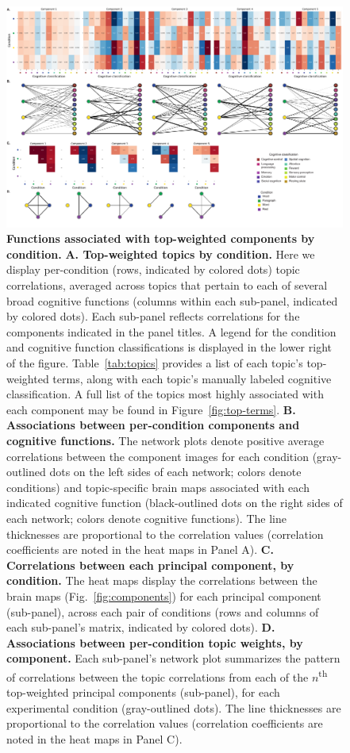 \documentclass[english]{article}
\begin{document}
\begin{figure}[tp]
  \centering
  \includegraphics[width=\textwidth]{figs/components_neurosynth_full}

\caption{\textbf{Functions associated with top-weighted components by
condition.} \textbf{A. Top-weighted topics by condition.} Here we display
per-condition (rows, indicated by colored dots) topic correlations, averaged
across topics that pertain to each of several broad cognitive functions
(columns within each sub-panel, indicated by colored dots). Each sub-panel
reflects correlations for the components indicated in the panel titles. A
legend for the condition and cognitive function classifications is displayed in
the lower right of the figure. Table~\ref{tab:topics} provides a list of each topic's
top-weighted terms, along with each topic's manually labeled cognitive
classification. A full list of the topics most highly associated with each
component may be found in Figure~\ref{fig:top-terms}. \textbf{B. Associations
between per-condition components and cognitive functions.} The network plots
denote positive average correlations between the component images for each
condition (gray-outlined dots on the left sides of each network; colors denote
conditions) and topic-specific brain maps associated with each indicated
cognitive function (black-outlined dots on the right sides of each network;
colors denote cognitive functions). The line thicknesses are proportional to
the correlation values (correlation coefficients are noted in the heat maps in
Panel A). \textbf{C. Correlations between each principal component, by
condition.} The heat maps display the correlations between the brain maps
(Fig.~\ref{fig:components}) for each principal component (sub-panel), across each
pair of conditions (rows and columns of each sub-panel's matrix, indicated by
colored dots). \textbf{D. Associations between per-condition topic weights, by
component.} Each sub-panel's network plot summarizes the pattern of correlations
between the topic correlations from each of the $n$\textsuperscript{th}
top-weighted principal components (sub-panel), for each experimental condition
(gray-outlined dots). The line thicknesses are proportional to the correlation
values (correlation coefficients are noted in the heat maps in Panel C).}

\label{fig:neurosynth-full}
\end{figure}

\newpage
\renewcommand{\refname}{Supplemental references}


\end{document}
